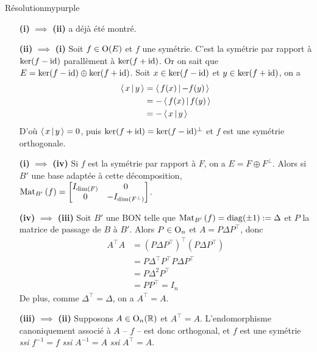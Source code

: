     \begin{demo}{Résolution}{mypurple}
        \begin{itemize}[leftmargin=3cm]
            \item[\textbf{(i)} $\implies$ \textbf{(ii)}] a déjà été montré.
            \item[\textbf{(ii)} $\implies$ \textbf{(i)}] Soit $f \in \operatorname{O}(E)$ et $f$ une symétrie. C’est la symétrie par rapport à $\ker(f - \operatorname{id})$ parallèment à $\ker(f + \operatorname{id})$. Or on sait que $E = \ker(f - \operatorname{id}) \oplus \ker(f + \operatorname{id})$. Soit $x \in \ker(f - \operatorname{id})$ et $y \in \ker(f + \operatorname{id})$, on a 
            \begin{align*}
                \left<\,x\,\middle|\,y\,\right>
                &= \left<\,f(x)\,\middle|\,-f(y)\,\right> \\
                &= - \left<\,f(x)\,\middle|\,f(y)\,\right> \\
                &= - \left<\,x\,\middle|\,y\,\right>
            \end{align*}
            D’où $\left<\,x\,\middle|\,y\,\right> = 0$, puis $\ker(f + \operatorname{id}) = \ker(f - \operatorname{id})^{\perp}$ et $f$ est une symétrie orthogonale.
            \item[\textbf{(i)} $\implies$ \textbf{(iv)}] Si $f$ est la symétrie par rapport à $F$, on a $E = F \oplus F^{\perp}$. Alors si $B'$ une base adaptée à cette décomposition, $\text{Mat}_{B'}\left(f\right) = \begin{bmatrix}
                I_{\dim(F)} & 0 \\
                0 & -I_{\dim(F^{\perp})}
            \end{bmatrix}$.
            \item[\textbf{(iv)} $\implies$ \textbf{(iii)}] Soit $B'$ une BON telle que $\text{Mat}_{B'}\left(f\right) = \operatorname{diag}(\pm 1) := \Delta$ et $P$ la matrice de passage de $B$ à $B'$. Alors $P \in \operatorname{O}_n$ et $A = P \Delta P^{\top}$, donc 
            \begin{align*}
                A^{\top} A 
                &= (P \Delta P^{\top})^{\top}(P \Delta P^{\top}) \\
                &= P \Delta^{\top} P^{\top} P \Delta P^{\top} \\
                &= P \Delta^2 P^{\top} \\
                &= P P^{\top} = I_n
            \end{align*}
            De plus, comme $\Delta^{\top} = \Delta$, on a $A^{\top} = A$.
            \item[\textbf{(iii)} $\implies$ \textbf{(ii)}] Supposons $A \in \operatorname{O}_n(\mathbb{R})$ et $A^{\top} = A$. L’endomorphisme canoniquement associé à $A$ -- $f$ -- est donc orthogonal, et $f$ est une symétrie \textit{ssi} $f^{-1} = f$ \textit{ssi} $A^{-1} = A$ \textit{ssi} $A^{\top} = A$.
        \end{itemize}
    \end{demo}

